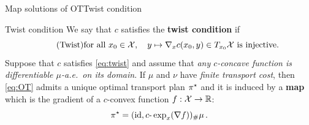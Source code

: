 \documentclass[9pt,xcolor={dvipsnames}]{beamer}
\begin{document}
\begin{frame}{Map solutions of OT}{Twist condition}
    \begin{block}{Twist condition }
        We say that $c$ satisfies the \textbf{twist condition} if
        \begin{equation}
            \tag{Twist}
            \text{for all }x_0\in\mathcal X,\quad  y\mapsto \nabla_x c(x_0,y)\in T_{x_0}\mathcal{X} \text{ is injective.}
            \label{eq:twist}
        \end{equation}
        Suppose that $c$ satisfies \cref{eq:twist} and assume that \emph{any $c$-concave function is differentiable $\mu$-a.e.~on its domain}. If $\mu$ and $\nu$ have \emph{finite transport cost}, then \cref{eq:OT} admits a unique optimal transport plan $\pi^\star$ and it is induced by a \textbf{map} which is the gradient of a $c$-convex function $f:\mathcal{X}\to\mathbb{R}$:
        $$\pi^\star=(\operatorname{id},c\text{-}\exp_x(\nabla f))_\#\mu\,.$$
            \vspace{-5mm}
    \end{block}
    \begin{columns}
        \begin{column}{.7\textwidth}
\end{column}
\end{columns}
\end{frame}
\end{document}
